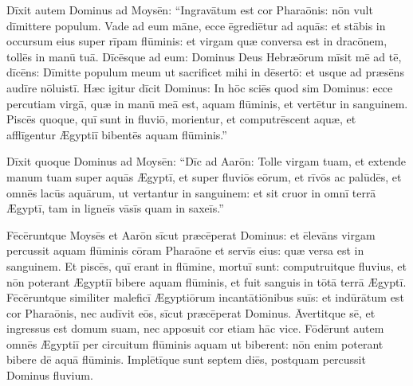 Dīxit autem Dominus
ad Moysēn: ``Ingravātum est cor
Pharaōnis: nōn vult dīmittere populum. Vade ad eum
māne, ecce ēgrediētur ad aquās: et stābis in occursum eius super rīpam
flūminis: et virgam quæ conversa est in dracōnem, tollēs
in manū tuā. Dīcēsque ad eum: Dominus Deus Hebræōrum
mīsit mē ad tē, dīcēns: Dīmitte populum meum ut sacrificet
mihi in dēsertō: et usque ad præsēns audīre nōluistī. Hæc igitur dīcit
Dominus: In hōc sciēs quod sim Dominus: ecce percutiam virgā, quæ in manū
meā est, aquam flūminis, et vertētur in sanguinem.  Piscēs quoque, quī
sunt in fluviō, morientur, et computrēscent aquæ, et
afflīgentur Ægyptiī bibentēs aquam flūminis.''

Dīxit
quoque Dominus ad Moysēn: ``Dīc ad Aarōn: Tolle virgam
tuam, et extende manum tuam super aquās Ægyptī, et super fluviōs eōrum, et
rīvōs ac palūdēs, et omnēs lacūs aquārum, ut vertantur in
sanguinem: et sit cruor in omnī terrā Ægyptī, tam in ligneīs vāsīs quam in
saxeīs.''

Fēcēruntque Moysēs et Aarōn
sīcut præcēperat Dominus: et
ēlevāns virgam percussit aquam flūminis cōram
Pharaōne et servīs eius: quæ versa est in sanguinem.  Et
piscēs, quī erant in flūmine, mortuī sunt: computruitque
fluvius, et nōn poterant Ægyptiī bibere aquam flūminis, et fuit sanguis in
tōtā terrā Ægyptī.  Fēcēruntque similiter maleficī
Ægyptiōrum incantātiōnibus suīs: et indūrātum est cor Pharaōnis, nec audīvit eōs, sīcut
præcēperat Dominus.  Āvertitque sē, et
ingressus est domum suam, nec apposuit cor etiam hāc vice.
 Fōdērunt autem omnēs Ægyptiī per circuitum flūminis
aquam ut biberent: nōn enim poterant bibere dē aquā flūminis. 
Implētīque sunt septem diēs, postquam percussit Dominus fluvium.
